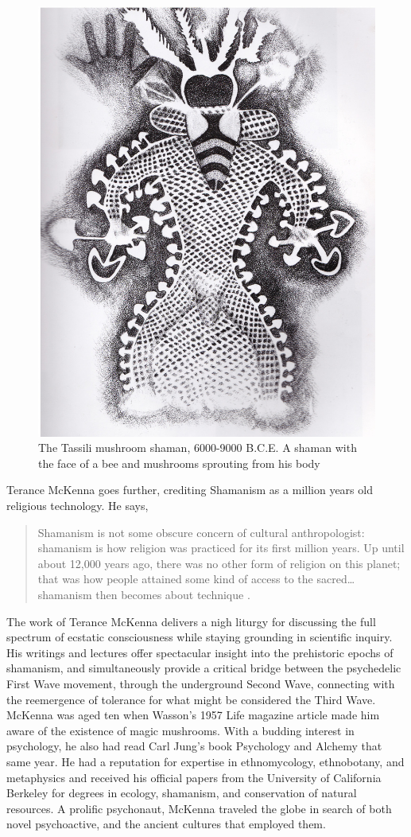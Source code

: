 \documentclass{UIdahoMastersThesis}
\begin{document}
 
\begin{figure}%
	\centering
	\includegraphics[width=0.54\linewidth]{tassili.jpg}
	\caption{The Tassili mushroom shaman, 6000-9000 B.C.E. A shaman with the face of a bee and mushrooms sprouting from his body}
	\label{fig:tassili}
\end{figure}
Terance McKenna goes further, crediting Shamanism as a million years old religious technology. He says, 

\begin{quote}
{Shamanism is not some obscure concern of cultural anthropologist: shamanism is how religion was practiced for its first million years. Up until about 12,000 years ago, there was no other form of religion on this planet; that was how people attained some kind of access to the sacred\ldots shamanism then becomes about technique \cite{noauthor_terence_nodate}.}
\end{quote}

The work of Terance McKenna delivers a nigh liturgy for discussing the full spectrum of ecstatic consciousness while staying grounding in scientific inquiry. His writings and lectures offer spectacular insight into the prehistoric epochs of shamanism, and simultaneously provide a critical bridge between the psychedelic First Wave movement, through the underground Second Wave, connecting with the reemergence of tolerance for what might be considered the Third Wave. McKenna was aged ten when Wasson's 1957 Life magazine article made him aware of the existence of magic mushrooms. With a budding interest in psychology, he also had read Carl Jung's book Psychology and Alchemy that same year. He had a reputation for expertise in ethnomycology, ethnobotany, and metaphysics and received his official papers from the University of California Berkeley for degrees in ecology, shamanism, and conservation of natural resources. A prolific psychonaut, McKenna traveled the globe in search of both novel psychoactive, and the ancient cultures that employed them.
\end{document}
